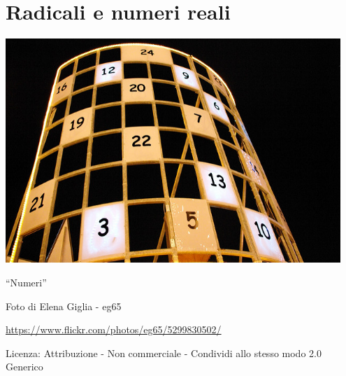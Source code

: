 \part{Radicali e numeri reali}

\includegraphics[width=0.95\textwidth]{img/numeri.jpg}
  \begin{center}
    {\large ``Numeri''}\par
    Foto di Elena Giglia - eg65\par
    \url{https://www.flickr.com/photos/eg65/5299830502/}\par
    Licenza: Attribuzione - Non commerciale - Condividi allo stesso modo 2.0 Generico\par
  \end{center}
\clearpage
\cleardoublepage
